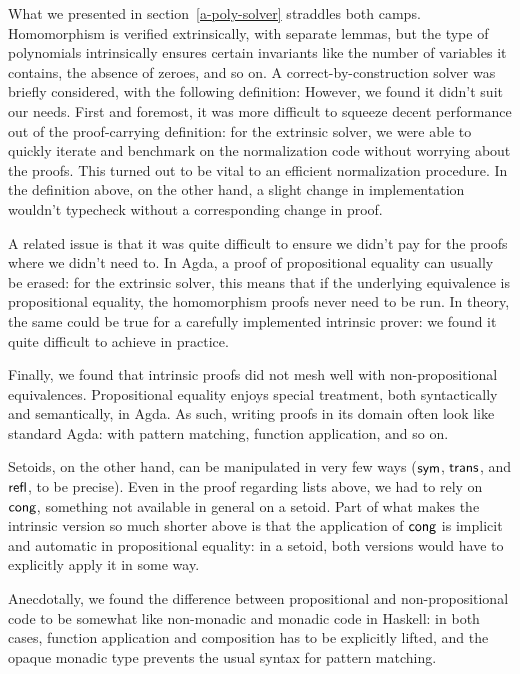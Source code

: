 \documentclass[draft, twocolumn]{article}
\theoremstyle{definition}
\theoremstyle{definition}
\begin{document}
What we presented in section~\ref{a-poly-solver} straddles both camps.
Homomorphism is verified extrinsically, with separate lemmas, but the type of
polynomials intrinsically ensures certain invariants like the number of
variables it contains, the absence of zeroes, and so on. A
correct-by-construction solver was briefly considered, with the following
definition:
However, we found it didn't suit our needs. First and foremost, it was more
difficult to squeeze decent performance out of the proof-carrying definition:
for the extrinsic solver, we were able to quickly iterate and benchmark on the
normalization code without worrying about the proofs. This turned out to be
vital to an efficient normalization procedure. In the definition above, on the
other hand, a slight change in implementation wouldn't typecheck without a
corresponding change in proof. 

A related issue is that it was quite difficult to ensure we didn't pay for the
proofs where we didn't need to. In Agda, a proof of propositional equality can
usually be erased: for the extrinsic solver, this means that if the underlying
equivalence is propositional equality, the homomorphism proofs never need to be
run. In theory, the same could be true for a carefully implemented intrinsic
prover: we found it quite difficult to achieve in practice.

Finally, we found that intrinsic proofs did not mesh well with non-propositional
equivalences. Propositional equality enjoys special treatment, both
syntactically and semantically, in Agda. As such, writing proofs in its domain
often look like standard Agda: with pattern matching, function application, and
so on.

Setoids, on the other hand, can be manipulated in very few ways
(\(\AgdaFunction{sym}\), \(\AgdaFunction{trans}\), and \(\AgdaFunction{refl}\),
to be precise). Even in the proof regarding lists above, we had to rely on
\(\AgdaFunction{cong}\), something not available in general on a setoid. Part of
what makes the intrinsic version so much shorter above is that the application
of \(\AgdaFunction{cong}\) is implicit and automatic in propositional equality:
in a setoid, both versions would have to explicitly apply it in some way.

Anecdotally, we found the difference between propositional and non-propositional
code to be somewhat like non-monadic and monadic code in Haskell: in both cases,
function application and composition has to be explicitly lifted, and the opaque
monadic type prevents the usual syntax for pattern matching.
\end{document}
